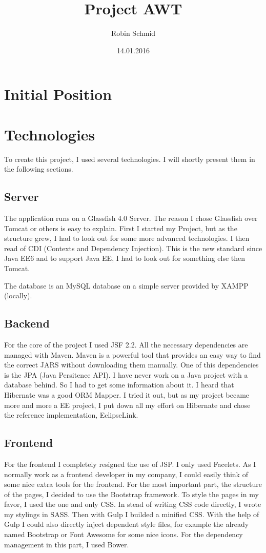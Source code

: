 \documentclass[11pt, halfparskip]{scrreprt}
\title{Project AWT}
\author{Robin Schmid}
\date{14.01.2016}
\begin{document}
\maketitle

\chapter{Initial Position}

\chapter{Technologies}
To create this project, I used several technologies. I will shortly present them in the following sections.
\section{Server}
The application runs on a Glassfish 4.0 Server. The reason I chose Glassfish over Tomcat or others is easy to explain. First I started my Project, but as the structure grew, I had to look out for some more advanced technologies. I then read of CDI (Contexts and Dependency Injection). This is the new standard since Java EE6 and to support Java EE, I had to look out for something else then Tomcat. 

The database is an MySQL database on a simple server provided by XAMPP (locally).

\section{Backend}
For the core of the project I used JSF 2.2. All the necessary dependencies are managed with Maven. Maven is a powerful tool that provides an easy way to find the correct JARS without downloading them manually. One of this dependencies is the JPA (Java Persitence API). I have never work on a Java project with a database behind. So I had to get some information about it. I heard that Hibernate was a good ORM Mapper. I tried it out, but as my project became more and more a EE project, I put down all my effort on Hibernate and chose the reference implementation, EclipseLink. 

\section{Frontend}
For the frontend I completely resigned the use of JSP. I only used Facelets. As I normally work as a frontend developer in my company, I could easily think of some nice extra tools for the frontend. For the most important part, the structure of the pages, I decided to use the Bootstrap framework. To style the pages in my favor, I used the one and only CSS. In stead of writing CSS code directly, I wrote my stylings in SASS. Then with Gulp I builded a minified CSS. With the help of Gulp I could also directly inject dependent style files, for example the already named Bootstrap or Font Awesome for some nice icons. For the dependency management in this part, I used Bower.
\end{document}
